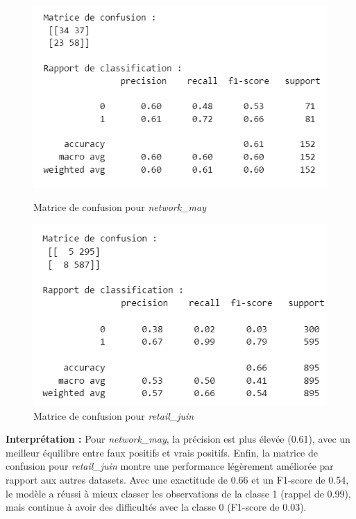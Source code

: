 \begin{figure}[H]
    \centering
    \begin{minipage}{0.45\linewidth}
        \centering
        \includegraphics[width=\linewidth]{capture_modele_4.png}
        \caption{Matrice de confusion pour \textit{network\_may}}
        \label{mmm}
    \end{minipage}
    \hfill
    \begin{minipage}{0.45\linewidth}
        \centering
        \includegraphics[width=\linewidth]{capture_modele_20.png}
        \caption{Matrice de confusion pour \textit{retail\_juin}}
        \label{nnn}
    \end{minipage}
\end{figure}

\textbf{Interprétation :} Pour \textit{network\_may}, la précision est plus élevée (0.61), avec un meilleur équilibre entre faux positifs et vrais positifs. Enfin, la matrice de confusion pour \textit{retail\_juin} montre une performance légèrement améliorée par rapport aux autres datasets. Avec une exactitude de 0.66 et un F1-score de 0.54, le modèle a réussi à mieux classer les observations de la classe 1 (rappel de 0.99), mais continue à avoir des difficultés avec la classe 0 (F1-score de 0.03).

